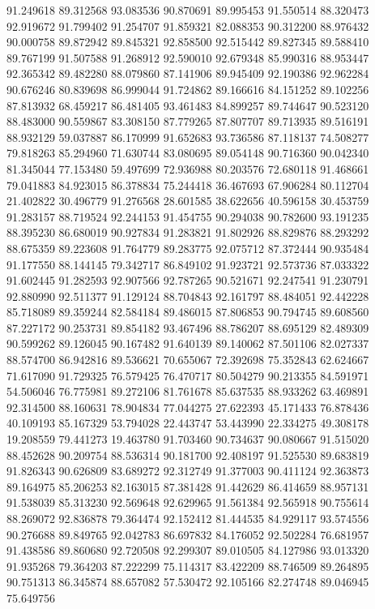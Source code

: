 91.249618
89.312568
93.083536
90.870691
89.995453
91.550514
88.320473
92.919672
91.799402
91.254707
91.859321
82.088353
90.312200
88.976432
90.000758
89.872942
89.845321
92.858500
92.515442
89.827345
89.588410
89.767199
91.507588
91.268912
92.590010
92.679348
85.990316
88.953447
92.365342
89.482280
88.079860
87.141906
89.945409
92.190386
92.962284
90.676246
80.839698
86.999044
91.724862
89.166616
84.151252
89.102256
87.813932
68.459217
86.481405
93.461483
84.899257
89.744647
90.523120
88.483000
90.559867
83.308150
87.779265
87.807707
89.713935
89.516191
88.932129
59.037887
86.170999
91.652683
93.736586
87.118137
74.508277
79.818263
85.294960
71.630744
83.080695
89.054148
90.716360
90.042340
81.345044
77.153480
59.497699
72.936988
80.203576
72.680118
91.468661
79.041883
84.923015
86.378834
75.244418
36.467693
67.906284
80.112704
21.402822
30.496779
91.276568
28.601585
38.622656
40.596158
30.453759
91.283157
88.719524
92.244153
91.454755
90.294038
90.782600
93.191235
88.395230
86.680019
90.927834
91.283821
91.802926
88.829876
88.293292
88.675359
89.223608
91.764779
89.283775
92.075712
87.372444
90.935484
91.177550
88.144145
79.342717
86.849102
91.923721
92.573736
87.033322
91.602445
91.282593
92.907566
92.787265
90.521671
92.247541
91.230791
92.880990
92.511377
91.129124
88.704843
92.161797
88.484051
92.442228
85.718089
89.359244
82.584184
89.486015
87.806853
90.794745
89.608560
87.227172
90.253731
89.854182
93.467496
88.786207
88.695129
82.489309
90.599262
89.126045
90.167482
91.640139
89.140062
87.501106
82.027337
88.574700
86.942816
89.536621
70.655067
72.392698
75.352843
62.624667
71.617090
91.729325
76.579425
76.470717
80.504279
90.213355
84.591971
54.506046
76.775981
89.272106
81.761678
85.637535
88.933262
63.469891
92.314500
88.160631
78.904834
77.044275
27.622393
45.171433
76.878436
40.109193
85.167329
53.794028
22.443747
53.443990
22.334275
49.308178
19.208559
79.441273
19.463780
91.703460
90.734637
90.080667
91.515020
88.452628
90.209754
88.536314
90.181700
92.408197
91.525530
89.683819
91.826343
90.626809
83.689272
92.312749
91.377003
90.411124
92.363873
89.164975
85.206253
82.163015
87.381428
91.442629
86.414659
88.957131
91.538039
85.313230
92.569648
92.629965
91.561384
92.565918
90.755614
88.269072
92.836878
79.364474
92.152412
81.444535
84.929117
93.574556
90.276688
89.849765
92.042783
86.697832
84.176052
92.502284
76.681957
91.438586
89.860680
92.720508
92.299307
89.010505
84.127986
93.013320
91.935268
79.364203
87.222299
75.114317
83.422209
88.746509
89.264895
90.751313
86.345874
88.657082
57.530472
92.105166
82.274748
89.046945
75.649756

